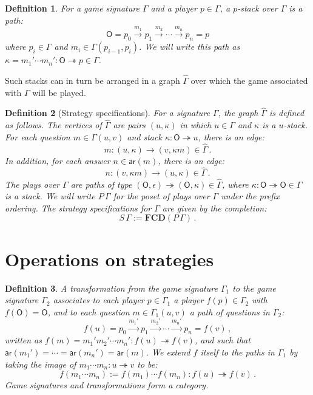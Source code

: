 \documentclass[draft,11pt]{report}
\newtheorem{definition}{Definition}
\newcommand{\kw}[1]{\ensuremath{ \mathsf{#1} }}
\begin{document}
\begin{definition}
For a game signature $\Gamma$ and a player $p \in \Gamma$,
a \emph{$p$-stack} over $\Gamma$ is a path:
\[
  \kw{O} = p_0 \xrightarrow{m_1} p_1 \xrightarrow{m_2} \cdots
             \xrightarrow{m_n} p_n = p
\]
where $p_i \in \Gamma$ and $m_i \in \Gamma(p_{i-1}, p_i)$.
We will write this path as
$\kappa = m_1' \cdots m_n' : \kw{O} \twoheadrightarrow p 
 \in \Gamma$.
\end{definition}

Such stacks can in turn be arranged in a graph $\hat{\Gamma}$
over which the game associated with $\Gamma$ will be played.

\begin{definition}[Strategy specifications] %
For a signature $\Gamma$,
the graph $\hat{\Gamma}$ is defined as follows.
The vertices of $\hat{\Gamma}$ are pairs $(u, \kappa)$
in which $u \in \Gamma$ and $\kappa$ is a $u$-stack.
For each question $m \in \Gamma(u,v)$
and stack $\kappa : \kw{O} \twoheadrightarrow u$,
there is an edge:
\[
    m : (u, \kappa) \rightarrow (v, \kappa m) \in \hat{\Gamma} \,.
\]
In addition, for each answer $n \in \kw{ar}(m)$,
there is an edge:
\[
    n : (v, \kappa m) \rightarrow (u, \kappa) \in \hat{\Gamma} \,.
\]
The \emph{plays} over $\Gamma$
are paths of type
$(\kw{O}, \epsilon) \twoheadrightarrow (\kw{O}, \kappa)
 \in \hat{\Gamma}$,
where $\kappa : \kw{O} \twoheadrightarrow \kw{O} \in \Gamma$
is a stack.
We will write
$P \, \Gamma$
for the poset of plays over $\Gamma$
under the prefix ordering.
The \emph{strategy specifications} for $\Gamma$
are given by the completion:
\[
    S \, \Gamma := \mathbf{FCD}(P \, \Gamma) \,.
\]
\end{definition}


\section{Operations on strategies} %

\begin{definition}
A \emph{transformation}
from the game signature $\Gamma_1$
to the game signature $\Gamma_2$
associates to each player $p \in \Gamma_1$ a player $f(p) \in \Gamma_2$
with $f(\kw{O}) = \kw{O}$,
and to each question $m \in \Gamma_1(u,v)$
a \emph{path} of questions in $\Gamma_2$:
\[
  f(u) = p_0 \xrightarrow{m_1'} p_1 \xrightarrow{m_2'} \cdots
             \xrightarrow{m_n'} p_n = f(v) \,,
\]
written as
$f(m) = m_1' m_2' \cdots m_n' : f(u) \twoheadrightarrow f(v)$, and
such that
$\kw{ar}(m_1') = \cdots = \kw{ar}(m_n') = \kw{ar}(m)$.
We extend $f$ itself to the paths in $\Gamma_1$
by taking the image of $m_1 \cdots m_n : u \twoheadrightarrow v$
to be:
\[
  f(m_1 \cdots m_n) := f(m_1) \cdots f(m_n) :
    f(u) \twoheadrightarrow f(v) \,.
\]
Game signatures and transformations form a category.
\end{definition}
\end{document}
